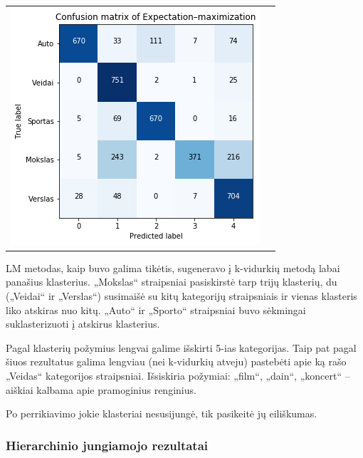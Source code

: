 \documentclass{VUMIFInfKursinis}
\begin{document}
\begin{table}[!h]
\begin{tabular}{ll}
\begin{minipage}[t]{0.47\columnwidth}
		\includegraphics[width=\columnwidth]{./Pictures/100002010000015F0000014D3D8F881D4BB6DB07.png}\strut
		\center{b)}
	\end{minipage}
\end{tabular}
\end{table}

LM metodas, kaip buvo galima tikėtis, sugeneravo į k-vidurkių metodą
labai panašius klasterius. „Mokslas“ straipsniai pasiskirstė tarp trijų
klasterių, du („Veidai“ ir „Verslas“) susimaišė su kitų kategorijų
straipsniais ir vienas klasteris liko atskiras nuo kitų. „Auto“ ir
„Sporto“ straipsniai buvo sėkmingai suklasterizuoti į atskirus
klasterius.

Pagal klasterių požymius lengvai galime išskirti 5-ias kategorijas. Taip
pat pagal šiuos rezultatus galima lengviau (nei k-vidurkių atveju)
pastebėti apie ką rašo „Veidas“ kategorijos straipsniai. Išsiskiria
požymiai: „film“, „dain“, „koncert“ – aiškiai kalbama apie
pramoginius renginius.

Po perrikiavimo jokie klasteriai nesusijungė, tik pasikeitė jų
eiliškumas.





\subsubsection{Hierarchinio jungiamojo rezultatai}
\end{document}
